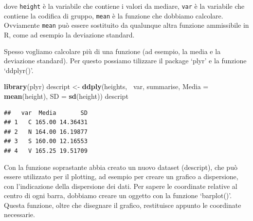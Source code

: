 \documentclass[a4paper,12pt,oneside]{book}
\newenvironment{Shaded}{\begin{snugshade}}{\end{snugshade}}
\newcommand{\KeywordTok}[1]{\textcolor[rgb]{0.13,0.29,0.53}{\textbf{#1}}}
\newcommand{\DataTypeTok}[1]{\textcolor[rgb]{0.13,0.29,0.53}{#1}}
\newcommand{\DecValTok}[1]{\textcolor[rgb]{0.00,0.00,0.81}{#1}}
\newcommand{\FloatTok}[1]{\textcolor[rgb]{0.00,0.00,0.81}{#1}}
\newcommand{\StringTok}[1]{\textcolor[rgb]{0.31,0.60,0.02}{#1}}
\newcommand{\OperatorTok}[1]{\textcolor[rgb]{0.81,0.36,0.00}{\textbf{#1}}}
\newcommand{\NormalTok}[1]{#1}
\begin{document}
dove \texttt{height} è la variabile che contiene i valori da mediare,
\texttt{var} è la variabile che contiene la codifica di gruppo,
\texttt{mean} è la funzione che dobbiamo calcolare. Ovviamente
\texttt{mean} può essere sostituito da qualunque altra funzione
ammissibile in R, come ad esempio la deviazione standard.

Spesso vogliamo calcolare più di una funzione (ad esempio, la media e la
deviazione standard). Per questo possiamo tilizzare il package `plyr' e
la funzione `ddplyr()'.

\begin{Shaded}
\begin{Highlighting}[]
\KeywordTok{library}\NormalTok{(plyr)}
\NormalTok{descript <-}\StringTok{ }\KeywordTok{ddply}\NormalTok{(heights, }\OperatorTok{~}\NormalTok{var, summarise, }
                  \DataTypeTok{Media =} \KeywordTok{mean}\NormalTok{(height), }
                  \DataTypeTok{SD =} \KeywordTok{sd}\NormalTok{(height))}
\NormalTok{descript}
\end{Highlighting}
\end{Shaded}

\begin{verbatim}
##   var  Media       SD
## 1   C 165.00 14.36431
## 2   N 164.00 16.19877
## 3   S 160.00 12.16553
## 4   V 165.25 19.51709
\end{verbatim}

Con la funzione soprastante abbia creato un nuovo dataset (descript),
che può essere utilizzato per il plotting, ad esempio per creare un
grafico a dispersione, con l'indicazione della dispersione dei dati. Per
sapere le coordinate relative al centro di ogni barra, dobbiamo creare
un oggetto con la funzione `barplot()'. Questa funzione, oltre che
disegnare il grafico, restituisce appunto le coordinate necessarie.

\begin{Shaded}
\end{Shaded}
\end{document}
